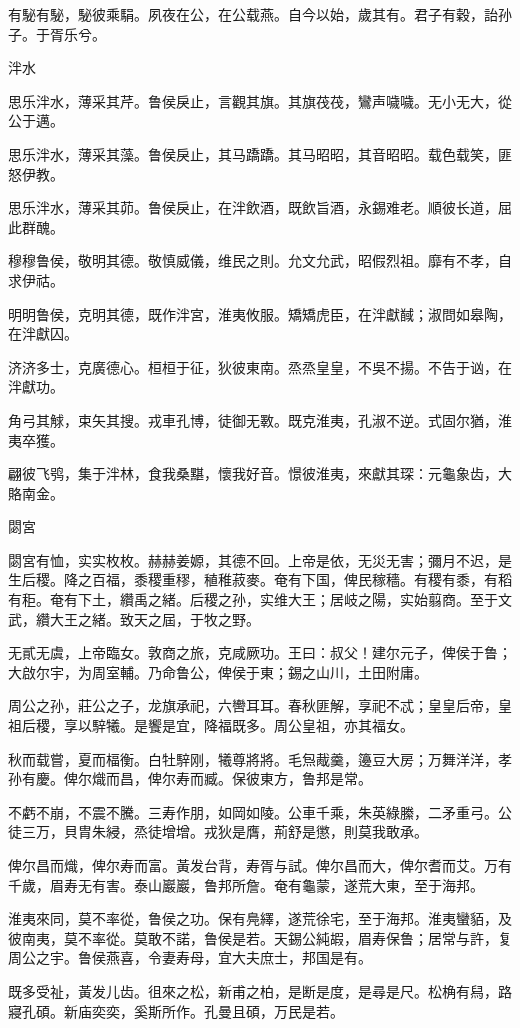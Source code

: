 有駜有駜，駜彼乘駽。夙夜在公，在公载燕。自今以始，歲其有。君子有穀，詒孙子。于胥乐兮。

泮水

思乐泮水，薄采其芹。鲁侯戾止，言觀其旗。其旗茷茷，鸞声噦噦。无小无大，從公于邁。

思乐泮水，薄采其藻。鲁侯戾止，其马蹻蹻。其马昭昭，其音昭昭。载色载笑，匪怒伊教。

思乐泮水，薄采其茆。鲁侯戾止，在泮飲酒，既飲旨酒，永錫难老。順彼长道，屈此群醜。

穆穆鲁侯，敬明其德。敬慎威儀，维民之則。允文允武，昭假烈祖。靡有不孝，自求伊祜。

明明鲁侯，克明其德，既作泮宮，淮夷攸服。矯矯虎臣，在泮獻馘；淑問如皋陶，在泮獻囚。

济济多士，克廣德心。桓桓于征，狄彼東南。烝烝皇皇，不吳不揚。不告于讻，在泮獻功。

角弓其觩，束矢其搜。戎車孔博，徒御无斁。既克淮夷，孔淑不逆。式固尔猶，淮夷卒獲。

翩彼飞鸮，集于泮林，食我桑黮，懷我好音。憬彼淮夷，來獻其琛：元龜象齿，大賂南金。

閟宮

閟宮有恤，实实枚枚。赫赫姜嫄，其德不回。上帝是依，无災无害；彌月不迟，是生后稷。降之百福，黍稷重穋，稙稚菽麥。奄有下国，俾民稼穡。有稷有黍，有稻有秬。奄有下土，纘禹之緒。后稷之孙，实维大王；居岐之陽，实始翦商。至于文武，纘大王之緒。致天之屆，于牧之野。

无貳无虞，上帝臨女。敦商之旅，克咸厥功。王曰：叔父！建尔元子，俾侯于鲁；大啟尔宇，为周室輔。乃命鲁公，俾侯于東；錫之山川，土田附庸。

周公之孙，莊公之子，龙旗承祀，六轡耳耳。春秋匪解，享祀不忒；皇皇后帝，皇祖后稷，享以騂犧。是饗是宜，降福既多。周公皇祖，亦其福女。

秋而载嘗，夏而楅衡。白牡騂刚，犧尊將將。毛炰胾羹，籩豆大房；万舞洋洋，孝孙有慶。俾尔熾而昌，俾尔寿而臧。保彼東方，鲁邦是常。

不虧不崩，不震不騰。三寿作朋，如岡如陵。公車千乘，朱英綠縢，二矛重弓。公徒三万，貝胄朱綅，烝徒增增。戎狄是膺，荊舒是懲，則莫我敢承。

俾尔昌而熾，俾尔寿而富。黃发台背，寿胥与試。俾尔昌而大，俾尔耆而艾。万有千歲，眉寿无有害。泰山巖巖，鲁邦所詹。奄有龜蒙，遂荒大東，至于海邦。

淮夷來同，莫不率從，鲁侯之功。保有鳧繹，遂荒徐宅，至于海邦。淮夷蠻貊，及彼南夷，莫不率從。莫敢不諾，鲁侯是若。天錫公純嘏，眉寿保鲁；居常与許，复周公之宇。鲁侯燕喜，令妻寿母，宜大夫庶士，邦国是有。

既多受祉，黃发儿齿。徂來之松，新甫之柏，是断是度，是尋是尺。松桷有舄，路寢孔碩。新庙奕奕，奚斯所作。孔曼且碩，万民是若。




